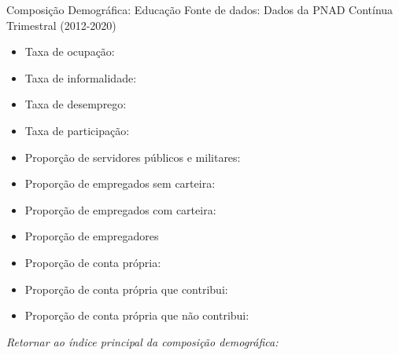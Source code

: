 \begin{frame}[label=_composicao_demografica_educacao]{Composição Demográfica: Educação}
{\footnotesize Fonte de dados: Dados da PNAD Contínua Trimestral (2012-2020)}
\begin{itemize}
\item{Taxa de ocupação: \hyperlink{_composicao_demografica_educacao_taxa_de_ocupacao}{}}
\item{Taxa de informalidade: \hyperlink{_composicao_demografica_educacao_taxa_de_informalidade}{}}
\item{Taxa de desemprego: \hyperlink{_composicao_demografica_educacao_taxa_de_desemprego}{}}
\item{Taxa de participação: \hyperlink{_composicao_demografica_educacao_taxa_de_participacao}{}}
\item{Proporção de servidores públicos e militares: \hyperlink{_composicao_demografica_educacao_prop_militar}{}}
\item{Proporção de empregados sem carteira: \hyperlink{_composicao_demografica_educacao_prop_empregadoSC}{}}
\item{Proporção de empregados com carteira: \hyperlink{_composicao_demografica_educacao_prop_empregadoCC}{}}
\item{Proporção de empregadores \hyperlink{_composicao_demografica_educacao_prop_empregador}{}}
\item{Proporção de conta própria: \hyperlink{_composicao_demografica_educacao_prop_cpropria}{}}
\item{Proporção de conta própria que contribui: \hyperlink{_composicao_demografica_educacao_prop_cpropriaC}{}}
\item{Proporção de conta própria que não contribui: \hyperlink{_composicao_demografica_educacao_prop_cpropriaNc}{}}
\end{itemize}

\begin{small}
\textit{Retornar ao índice principal da composição demográfica: \hyperlink{_composicao_demografica}{} }
\end{small}

\end{frame}

